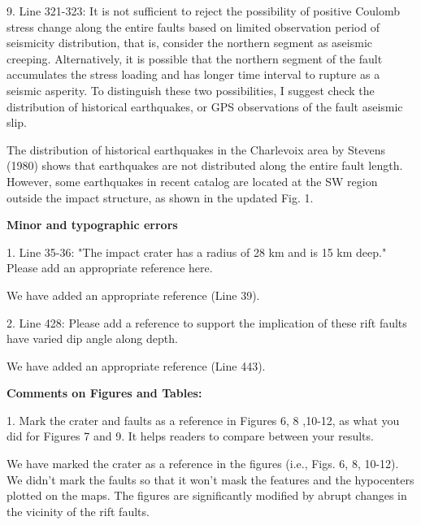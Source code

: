 \documentclass[12pt]{article}
\begin{document}
\begin{response}{9. Line 321-323: It is not sufficient to reject the possibility of positive Coulomb stress change along the entire faults based on limited observation period of seismicity distribution, that is, consider the northern segment as aseismic creeping. Alternatively, it is possible that the northern segment of the fault accumulates the stress loading and has longer time interval to rupture as a seismic asperity. To distinguish these two possibilities, I suggest check the distribution of historical earthquakes, or GPS observations of the fault aseismic slip.}

  The distribution of historical earthquakes in the Charlevoix area by Stevens (1980) shows that earthquakes are not distributed along the entire fault length. However, some earthquakes  in recent catalog are located at the SW region outside the impact structure, as shown in the updated Fig. 1.
  

\end{response}

\textbf{Minor and typographic errors} 

\begin{response}{1. Line 35-36: "The impact crater has a radius of 28 km and is 15 km deep." Please add an appropriate reference here.}

  We have added an appropriate reference (Line 39).
\end{response}

\begin{response}{2. Line 428: Please add a reference to support the implication of these rift faults have varied dip angle along depth.}

  We have added an appropriate reference (Line 443).
\end{response}

\textbf{Comments on Figures and Tables:}

\begin{response}{1. Mark the crater and faults as a reference in Figures 6, 8 ,10-12, as what you did for Figures 7 and 9. It helps readers to compare between your results.}

  We have marked the crater as a reference in the figures (i.e., Figs. 6, 8, 10-12). We didn't mark the faults so that it won't mask the features and the hypocenters plotted on the maps. The figures are significantly modified by abrupt changes in the vicinity of the rift faults.
\end{response}
\end{document}
